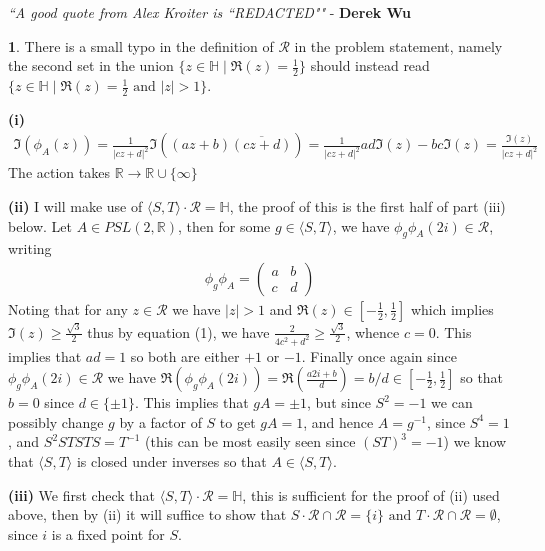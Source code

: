 \documentclass[10.5pt]{article}
\theoremstyle{definition}
\newtheorem{pb}{}
\newcommand{\set}[1]{\{#1\}}
\newcommand{\gen}[1]{\langle#1\rangle}
\newcommand{\abs}[1]{\left\vert#1\right\vert}
\newcommand{\tand}{\text{ and }}
\begin{document}
    \emph{``A good quote from Alex Kroiter is ``REDACTED""} - \textbf{Derek Wu}

    \begin{pb}
        There is a small typo in the definition of \(\mathcal{R}\) in the problem statement, namely the second set in the union \(\set{z \in \mathbb{H} \mid \Re(z) = \frac12}\) should instead read \(\set{z \in \mathbb{H} \mid \Re(z) = \frac12 \tand \abs{z} > 1}\).

        \textbf{(i)} 
        \begin{align}
            \Im(\phi_A(z)) = \frac{1}{\abs{cz+d}^2}\Im((az+b)\overline{(cz+d)}) = \frac{1}{\abs{cz+d}^2} ad\Im(z) - bc\Im(z) = \frac{\Im(z)}{\abs{cz+d}^2}
        \end{align}
        The action takes \(\mathbb{R} \to \mathbb{R} \cup \set{\infty}\)

        \textbf{(ii)} I will make use of \(\gen{S,T} \cdot\mathcal{R} = \mathbb{H}\), the proof of this is the first half of part (iii) below. Let \(A \in PSL(2,\mathbb{R})\), then for some \(g \in \gen{S,T}\), we have \(\phi_g\phi_A(2i) \in \mathcal{R}\), writing
        \begin{align}
            \phi_g\phi_A = \begin{pmatrix} a & b \\ c & d \end{pmatrix}
        \end{align}
        Noting that for any \(z \in \mathcal{R}\) we have \(\abs{z} > 1\) and \(\Re(z) \in \left[-\frac12,\frac12\right]\) which implies \(\Im(z) \geq \frac{\sqrt{3}}{2}\) thus by equation (1), we have \(\frac{2}{4c^2 + d^2} \geq \frac{\sqrt{3}}{2}\), whence \(c = 0\). This implies that \(ad = 1\) so both are either \(+1\) or \(-1\). Finally once again since \(\phi_g\phi_A(2i) \in \mathcal{R}\) we have \(\Re(\phi_g\phi_A(2i)) = \Re\left(\frac{a2i + b}{d}\right) = b/d \in [-\frac12,\frac12]\) so that \(b = 0\) since \(d \in \set{\pm 1}\). This implies that \(gA = \pm 1\), but since \(S^2 = -1\) we can possibly change \(g\) by a factor of \(S\) to get \(gA = 1\), and hence \(A = g^{-1}\), since \(S^4 = 1\), and \(S^2 STSTS = T^{-1}\) (this can be most easily seen since \((ST)^3 = -1\)) we know that \(\gen{S,T}\) is closed under inverses so that \(A \in \gen{S,T}\).

        \textbf{(iii)} We first check that \(\gen{S,T} \cdot\mathcal{R} = \mathbb{H}\), this is sufficient for the proof of (ii) used above, then by (ii) it will suffice to show that \(S \cdot \mathcal{R} \cap \mathcal{R} = \set{i} \tand T \cdot \mathcal{R} \cap \mathcal{R} = \emptyset\), since \(i\) is a fixed point for \(S\).


\end{pb}
\end{document}
